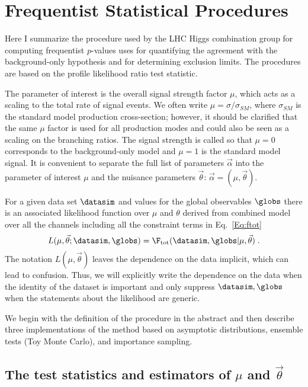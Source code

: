 \section{Frequentist Statistical Procedures}
\label{UE:Inputs} 

Here I summarize the procedure used by the LHC Higgs combination group  for computing frequentist  $p$-values uses for 
quantifying the agreement with the background-only hypothesis and for determining exclusion limits.  
The procedures are based on the profile likelihood ratio test statistic.  


The parameter of interest is the overall signal strength factor $\mu$, which acts as a scaling to the total rate of signal events.  We often write $\mu=\sigma/\sigma_{SM}$, where $\sigma_{SM}$ is the standard model production cross-section; however, it should be clarified that the same $\mu$ factor is used for all production modes and could also be seen as a scaling on the branching ratios.  The signal strength is called so that $\mu=0$ corresponds to the background-only model and $\mu=1$ is the standard model signal.  It is convenient to separate the full list of parameters $\vec\alpha$ into the parameter of interest $\mu$ and the nuisance parameters $\vec\theta$: $\vec\alpha=(\mu,\vec\theta)$.


For a given data set $\datasim$ and values for the global observables $\globs$ there is an associated likelihood function over $\mu$ and $\theta$ derived from combined model over all the channels including all the constraint terms in Eq.~\ref{Eq:ftot}
\begin{equation}
L(\mu,\vec\theta;\datasim,\globs) = \F_{\rm tot}(\datasim,\globs|\mu,\vec\theta) \;.
\end{equation}
The notation $L(\mu,\vec\theta)$ leaves the dependence on the data implicit, which can lead to confusion.  Thus, we will explicitly write the dependence on the data when the identity of the dataset is important and only suppress $\datasim,\globs$ when the statements about the likelihood are generic.


We begin with the definition of the procedure in the abstract and then describe three implementations of the method based on asymptotic distributions, ensemble tests (Toy Monte Carlo),  and importance sampling.


\subsection{The test statistics and estimators of $\mu$ and $\vec\theta$}


